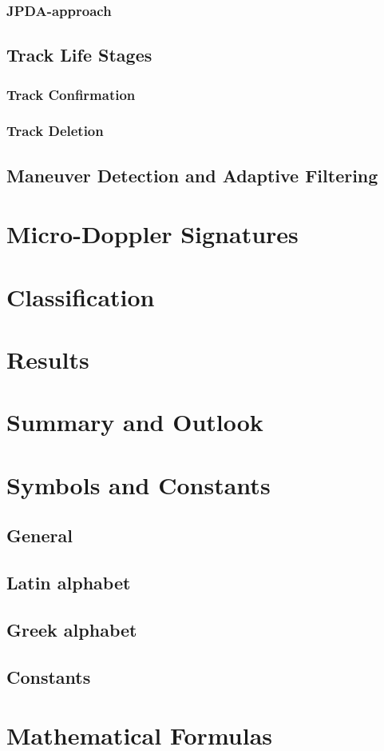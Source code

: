 \documentclass[DIV=15,
fleqn
numbers=noenddot,
headsepline,
captions=tableabove,twoside, openright]{scrreprt}
\begin{document}
\subsection{JPDA-approach}\label{mtt:jpda}
\section{Track Life Stages}\label{mtt:management}

\subsection{Track Confirmation}
\subsection{Track Deletion}
\section{Maneuver Detection and Adaptive Filtering}\label{mtt:maneuver}
\chapter{Micro-Doppler Signatures}
\chapter{Classification}
\chapter{Results}
\chapter{Summary and Outlook}
\begin{appendices}
\chapter{Symbols and Constants}
\section*{General}

\section*{Latin alphabet}	

\section*{Greek alphabet}	

\section*{Constants}	

\chapter{Mathematical Formulas}


\end{appendices}
\newpage




\newpage
\end{document}
